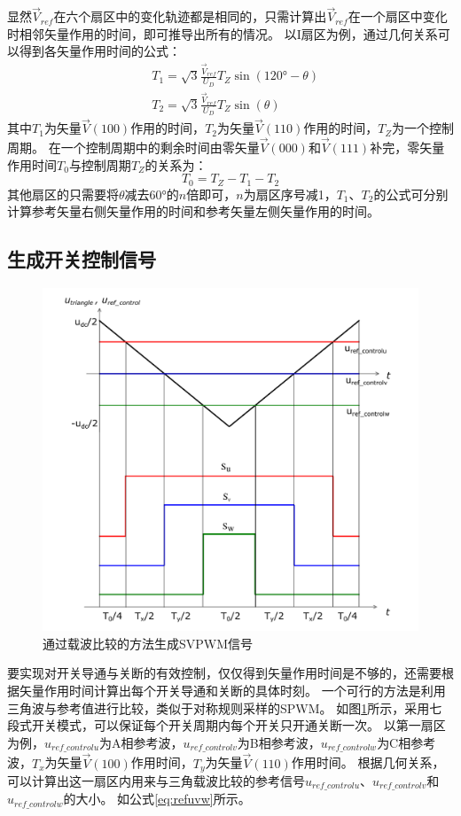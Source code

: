\documentclass{ctexart}
\numberwithin{equation}{section}
\begin{document}
显然$ \vec V_{ref} $在六个扇区中的变化轨迹都是相同的，只需计算出$ \vec V_{ref} $在一个扇区中变化时相邻矢量作用的时间，即可推导出所有的情况。
以I扇区为例，通过几何关系可以得到各矢量作用时间的公式：
\begin{align}
& \label{eq:T1} T_{1}=\sqrt{3} \frac{\vec V_{ref}}{U_D} T_{Z} \sin \left(\ang{120}-\theta\right)\\
& \label{eq:T2} T_{2}=\sqrt{3} \frac{\vec V_{ref}}{U_D} T_{Z} \sin (\theta)
\end{align}
其中$T_1$为矢量$\vec V(100)$作用的时间，$T_2$为矢量$\vec V(110)$作用的时间，$T_Z$为一个控制周期。
在一个控制周期中的剩余时间由零矢量$\vec V(000)$和$\vec V(111)$补完，零矢量作用时间$T_0$与控制周期$T_Z$的关系为：
\begin{equation} 
	T_{0}=T_{Z}-T_{1} -T_{2}
\end{equation}
其他扇区的只需要将$ \theta $减去\ang{60}的$ n $倍即可，$ n $为扇区序号减1，$T_1$、$T_2$的公式可分别计算参考矢量右侧矢量作用的时间和参考矢量左侧矢量作用的时间。

\subsection{生成开关控制信号}
\begin{figure}[htb]
  \centering
  \includegraphics[width = .55\linewidth ]{svpwm_modulation_wave.pdf}
  \caption{通过载波比较的方法生成SVPWM信号}
  \label{fig:svpwm-wave}
\end{figure}

要实现对开关导通与关断的有效控制，仅仅得到矢量作用时间是不够的，还需要根据矢量作用时间计算出每个开关导通和关断的具体时刻。
一个可行的方法是利用三角波与参考值进行比较，类似于对称规则采样的SPWM。
如图\ref{fig:svpwm-wave}所示，采用七段式开关模式，可以保证每个开关周期内每个开关只开通关断一次。
以第一扇区为例，$u_{ref\_controlu}$为A相参考波，$u_{ref\_controlv}$为B相参考波，$u_{ref\_controlw}$为C相参考波，$ T_x $为矢量$ \vec V(100) $作用时间，$ T_y $为矢量$ \vec V(110) $作用时间。
根据几何关系，可以计算出这一扇区内用来与三角载波比较的参考信号$u_{ref\_controlu}$、$u_{ref\_controlv}$和$u_{ref\_controlw}$的大小。
如公式\ref{eq:refuvw}所示。
\end{document}
